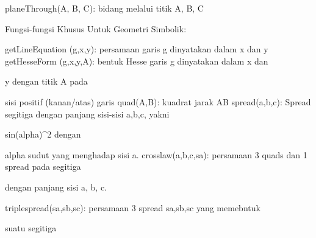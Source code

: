 \documentclass[a4paper,10pt]{article}
\begin{document}
\begin{eulernotebook}
\begin{eulercomment}
\begin{eulercomment}
\begin{eulercomment}
\begin{eulercomment}
\begin{eulercomment}
\begin{eulercomment}
\begin{eulercomment}
\begin{eulercomment}
\begin{eulercomment}
\begin{eulercomment}
\begin{eulercomment}
\begin{eulercomment}
\begin{eulercomment}
\begin{eulercomment}
\begin{eulercomment}
\begin{eulercomment}
\begin{eulercomment}
\begin{eulercomment}
\begin{eulercomment}
\begin{eulercomment}
\begin{eulercomment}
\begin{eulercomment}
\begin{eulercomment}
\begin{eulercomment}
\begin{eulercomment}
\begin{eulercomment}
\begin{eulercomment}
\begin{eulercomment}
\begin{eulercomment}
\begin{eulercomment}
\begin{eulerttcomment}
  planeThrough(A, B, C):  bidang melalui titik A, B, C
\end{eulerttcomment}
\begin{eulercomment}

Fungsi-fungsi Khusus Untuk Geometri Simbolik:

\end{eulercomment}
\begin{eulerttcomment}
  getLineEquation (g,x,y): persamaan garis g dinyatakan dalam x dan y
  getHesseForm (g,x,y,A): bentuk Hesse garis g dinyatakan dalam x dan
\end{eulerttcomment}
\begin{eulercomment}
y dengan titik A pada\\
\end{eulercomment}
\begin{eulerttcomment}
  sisi positif (kanan/atas) garis
  quad(A,B): kuadrat jarak AB
  spread(a,b,c): Spread segitiga dengan panjang sisi-sisi a,b,c, yakni
\end{eulerttcomment}
\begin{eulercomment}
sin(alpha)\textasciicircum{}2 dengan\\
\end{eulercomment}
\begin{eulerttcomment}
  alpha sudut yang menghadap sisi a.
  crosslaw(a,b,c,sa): persamaan 3 quads dan 1 spread pada segitiga
\end{eulerttcomment}
\begin{eulercomment}
dengan panjang sisi a, b, c.\\
\end{eulercomment}
\begin{eulerttcomment}
  triplespread(sa,sb,sc): persamaan 3 spread sa,sb,sc yang memebntuk
\end{eulerttcomment}
\begin{eulercomment}
suatu segitiga\\
\end{eulercomment}

\end{eulercomment}
\end{eulercomment}
\end{eulercomment}
\end{eulercomment}
\end{eulercomment}
\end{eulercomment}
\end{eulercomment}
\end{eulercomment}
\end{eulercomment}
\end{eulercomment}
\end{eulercomment}
\end{eulercomment}
\end{eulercomment}
\end{eulercomment}
\end{eulercomment}
\end{eulercomment}
\end{eulercomment}
\end{eulercomment}
\end{eulercomment}
\end{eulercomment}
\end{eulercomment}
\end{eulercomment}
\end{eulercomment}
\end{eulercomment}
\end{eulercomment}
\end{eulercomment}
\end{eulercomment}
\end{eulercomment}
\end{eulercomment}
\end{eulercomment}
\end{eulernotebook}
\end{document}
